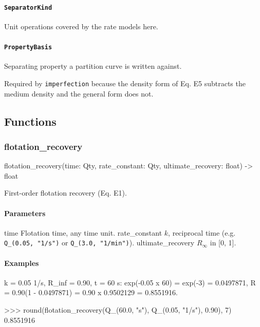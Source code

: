 \documentclass[10pt,a4paper,twoside]{report}
\begin{document}
\paragraph{\texttt{SeparatorKind}}

Unit operations covered by the rate models here.

\paragraph{\texttt{PropertyBasis}}

Separating property a partition curve is written against.

Required by \texttt{imperfection} because the density form of Eq. E5 subtracts the medium density and the general form does not.

\subsection*{Functions}

\subsubsection*{flotation\_recovery}

\begin{verbatimsmall}
flotation_recovery(time: Qty, rate_constant: Qty, ultimate_recovery: float) -> float
\end{verbatimsmall}

First-order flotation recovery (Eq. E1).

\paragraph*{Parameters}

time Flotation time, any time unit. rate\_constant $k$, reciprocal time (e.g. \texttt{Q\_(0.05, "1/s")} or \texttt{Q\_(3.0, "1/min")}). ultimate\_recovery $R_{\infty}$ in [0, 1].

\paragraph*{Examples}

k = 0.05 1/s, R\_inf = 0.90, t = 60 s: exp(-0.05 x 60) = exp(-3) = 0.0497871, R = 0.90(1 - 0.0497871) = 0.90 x 0.9502129 = 0.8551916.

\begin{doctestblock}
>>> round(flotation_recovery(Q_(60.0, "s"), Q_(0.05, "1/s"), 0.90), 7)
0.8551916
\end{doctestblock}
\end{document}

